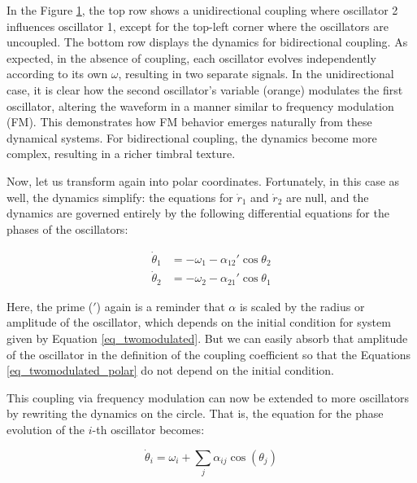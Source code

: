 \documentclass{article}
\begin{document}
In the Figure \ref{fig_twomodulated}, the top row shows a unidirectional coupling where oscillator 2 influences oscillator 1, except for the top-left corner where the oscillators are uncoupled. 
The bottom row displays the dynamics for bidirectional coupling. 
As expected, in the absence of coupling, each oscillator evolves independently according to its own $\omega$, resulting in two separate signals. 
In the unidirectional case, it is clear how the second oscillator's variable (orange) modulates the first oscillator, altering the waveform in a manner similar to frequency modulation (FM). 
This demonstrates how FM behavior emerges naturally from these dynamical systems. 
For bidirectional coupling, the dynamics become more complex, resulting in a richer timbral texture.

Now, let us transform again into polar coordinates. 
Fortunately, in this case as well, the dynamics simplify: the equations for $\dot{r}_1$ and $\dot{r}_2$ are null, and the dynamics are governed entirely by the following differential equations for the phases of the oscillators:

\begin{align} \label{eq_twomodulated_polar}
    \dot{\theta}_1 & = -\omega_1  - \alpha_{12}' \cos{\theta}_2 \\
    \dot{\theta}_2 & = -\omega_2  - \alpha_{21}' \cos{\theta}_1
\end{align}

Here, the prime ($'$) again is a reminder that $\alpha$ is scaled by the radius or amplitude of the oscillator, which depends on the initial condition for system given by Equation \ref{eq_twomodulated}. 
But we can easily absorb that amplitude of the oscillator in the definition of the coupling coefficient so that the Equations \ref{eq_twomodulated_polar} do not depend on the initial condition.



\begin{figure} [h]
    \centerline{}
    \caption{}
    \label{fig_twomodulated}
\end{figure}

This coupling via frequency modulation can now be extended to more oscillators by rewriting the dynamics on the circle. That is, the equation for the phase evolution of the $i$-th oscillator becomes:

\begin{equation}
    \dot{\theta}_i = \omega_i + \sum_j \alpha_{ij} \cos({\theta_j})
\end{equation}
\end{document}
